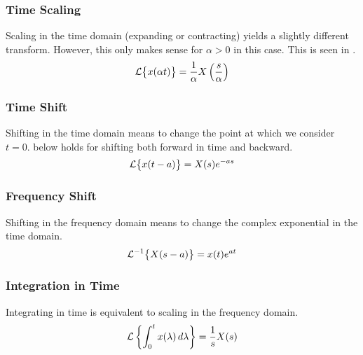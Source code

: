 \subsubsection{Time Scaling}\label{subsubsec:Laplace_Time_Scaling}
Scaling in the time domain (expanding or contracting) yields a slightly different transform.
However, this only makes sense for $\alpha > 0$ in this case.
This is seen in .
\begin{equation}\label{eq:Laplace_Time_Scaling}
  \operatorname{\mathcal{L}} \bigl\lbrace x(\alpha t) \bigr\rbrace = \frac{1}{\alpha} X \left( \frac{s}{\alpha} \right)
\end{equation}

\subsubsection{Time Shift}\label{subsubsec:Laplace_Time_Shift}
Shifting in the time domain means to change the point at which we consider $t=0$.
 below holds for shifting both forward in time and backward.
\begin{equation}\label{eq:Laplace_Time_Shifting}
  \operatorname{\mathcal{L}} \bigl\lbrace x(t-a) \bigr\rbrace = X(s) e^{-a s}
\end{equation}

\subsubsection{Frequency Shift}\label{subsubsec:Laplace_Frequency_Shift}
Shifting in the frequency domain means to change the complex exponential in the time domain.
\begin{equation}\label{eq:Laplace_Frequency_Shift}
  \operatorname{\mathcal{L}}^{-1} \bigl\lbrace X(s-a) \bigr\rbrace = x(t)e^{at}
\end{equation}

\subsubsection{Integration in Time}\label{subsubsec:Laplace_Time_Integration}
Integrating in time is equivalent to scaling in the frequency domain.
\begin{equation}\label{eq:Laplace_Time_Integration}
  \operatorname{\mathcal{L}} \left\lbrace \int_{0}^{t} x(\lambda) \, d\lambda \right\rbrace = \frac{1}{s} X(s)
\end{equation}


